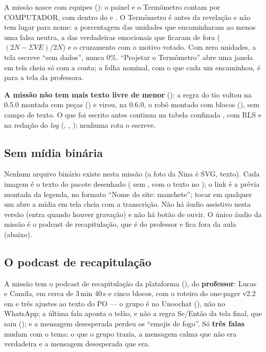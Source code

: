 A missão nasce com equipes (): o painel e o Termômetro contam por
COMPUTADOR, com  dentro do  e
. O Termômetro é  antes da revelação e não tem
lugar para nome: a porcentagem das unidades que encaminharam ao menos uma falsa
neutra, a das verdadeiras emocionais que ficaram de fora ($(2N - \Sigma
VE)/2N$) e o cruzamento com o motivo votado. Com zero unidades, a tela escreve
\enquote{sem dados}, nunca 0\%. \enquote{Projetar o Termômetro} abre uma janela
em tela cheia só com a conta; a folha nominal, com o que cada um encaminhou, é
para a tela da professora.

\begin{regra}
\textbf{A missão não tem mais texto livre de menor} (): a regra
do tio voltou na 0.5.0 montada com peças () e virou, na 0.6.0,
o robô montado com blocos (), sem campo de texto. O que foi escrito antes continua na tabela confinada
, com RLS e na redação do \emph{log} (,
, ); nenhuma rota o escreve.
\end{regra}

\subsection{Sem mídia binária}

Nenhum arquivo binário existe nesta missão (a foto da Nina é SVG, texto). Cada
imagem é o texto do pacote desenhado ( sem ,
com o texto no ); o
link é a prévia montada da legenda, no formato \enquote{Nome do site: manchete};
tocar em qualquer um abre a mídia em tela cheia com a transcrição. Não há áudio
assistivo nesta versão (entra quando houver gravação) e não há botão de ouvir.
O único áudio da missão é o podcast de recapitulação, que é do professor e
fica fora da aula (abaixo).

\subsection{O podcast de recapitulação}

A missão tem o podcast de recapitulação da plataforma (), do
\textbf{professor}: Lucas e Camila, em cerca de 3\,min 40\,s e cinco blocos, com
o roteiro do one-pager v2.2 em  e três
ajustes ao texto do PO --- o grupo é no Unoochat (), não no
WhatsApp; a última fala aponta o telão, e não a regra Se/Então da tela final,
que saiu (); e a mensagem desesperada perdeu os \enquote{emojis de
fogo}. Só \textbf{três falas} mudam com o tema: o que o grupo trazia, a mensagem
calma que não era verdadeira e a mensagem desesperada que era.


